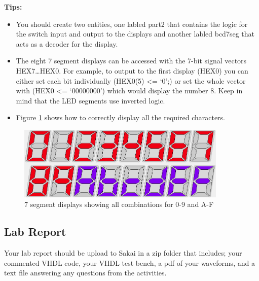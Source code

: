 {\bf Tips:} 
\begin{itemize}
	\item You should create two entities, one labled part2 that contains the logic for the switch input and output to the displays and another labled bcd7seg that acts as a decoder for the display.
	
	\item The eight 7 segment displays can be accessed with the 7-bit signal vectors HEX7\ldots HEX0. For example, to output to the first display (HEX0) you can either set each bit individually (HEX0(5) <= `0';) or set the whole vector with (HEX0 <= `00000000') which would display the number 8. Keep in mind that the LED segments use inverted logic.
	  
	\item Figure \ref{fig:7segreference} shows how to correctly display all the required characters.
\end{itemize}

\begin{figure}[H]
	\centering
	\includegraphics[width=100mm]{Lab1/figures/7segreference.png}
	\caption{7 segment displays showing all combinations for 0-9 and A-F}
	\label{fig:7segreference}
\end{figure}

\subsection{Lab Report}

Your lab report should be upload to Sakai in a zip folder that includes; your commented VHDL code, your VHDL test bench, a pdf of your waveforms, and a text file answering any questions from the activities.


